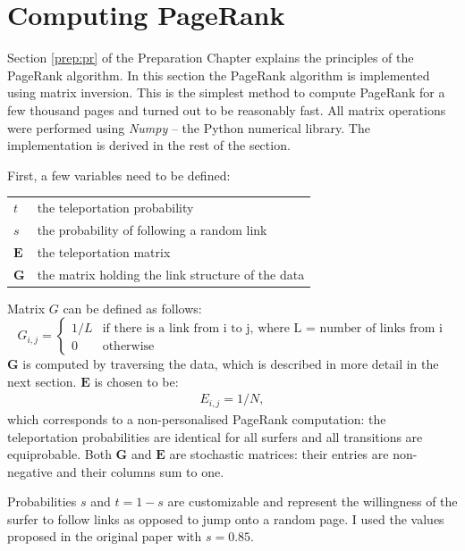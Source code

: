 \documentclass[12pt,notitlepage,twoside]{scrreprt}
\begin{document}
\section{Computing PageRank} 
\label{impl:pr}

Section \ref{prep:pr} of the Preparation Chapter explains the principles of the PageRank
algorithm. In this section the PageRank algorithm is implemented using matrix inversion.
This is the simplest method to compute PageRank for a few thousand pages and turned
out to be reasonably fast. All matrix operations were performed using \textit{Numpy} --
the Python numerical library. The implementation is derived in the rest of the section.

First, a few variables need to be defined:

\begin{tabular}[h!]{l l}
	\(t\) & the teleportation probability \\
	\(s\) & the probability of following a random link \\
	\(\bm{E}\) & the teleportation matrix \\
	\(\bm{G}\) & the matrix holding the link structure of the data \\
\end{tabular}

Matrix \(G\) can be defined as follows:
\begin{equation*}
	G_{i,j} = \begin{cases}
    1/L & \text{if there is a link from i to j, where L = number of links from i}\\
    0   & \text{otherwise}
  \end{cases}
\end{equation*}
\(\bm{G}\) is computed by traversing the data, which is described in more detail in the next
section. \(\bm{E}\) is chosen to be:
\begin{gather*}
	E_{i,j} = 1/N, 
\end{gather*}
which corresponds to a non-personalised PageRank computation: the teleportation
probabilities are identical for all surfers and all transitions are equiprobable.
Both \(\bm{G}\) and \(\bm{E}\) are stochastic matrices: their entries are non-negative and their columns sum
to one.

Probabilities \(s\) and \(t=1-s\) are customizable and represent the willingness of the surfer to
follow links as opposed to jump onto a random page. I used the values proposed in the
original paper\cite{pagerank} with \(s=0.85\).
\end{document}

